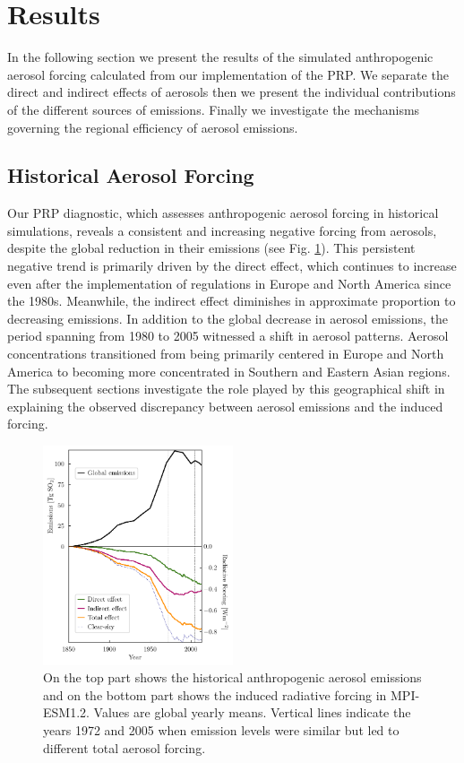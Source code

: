 \documentclass[draft]{agujournal2019}
\begin{document}
\section{Results}
      In the following section we present the results of the simulated anthropogenic aerosol forcing calculated from our implementation of the PRP. We separate the direct and indirect effects of aerosols then we present the individual contributions of the different sources of emissions. Finally we investigate the mechanisms governing the regional efficiency of aerosol emissions.

      \subsection{Historical Aerosol Forcing}
            Our PRP diagnostic, which assesses anthropogenic aerosol forcing in historical simulations, reveals a consistent and increasing negative forcing from aerosols, despite the global reduction in their emissions (see Fig. \ref{fig:figure1}). This persistent negative trend is primarily driven by the direct effect, which continues to increase even after the implementation of regulations in Europe and North America since the 1980s. Meanwhile, the indirect effect diminishes in approximate proportion to decreasing emissions.
            In addition to the global decrease in aerosol emissions, the period spanning from 1980 to 2005 witnessed a shift in aerosol patterns. Aerosol concentrations transitioned from being primarily centered in Europe and North America to becoming more concentrated in Southern and Eastern Asian regions.
            The subsequent sections investigate the role played by this geographical shift in explaining the observed discrepancy between aerosol emissions and the induced forcing.

      \begin{figure}
            \centering
            \noindent\includegraphics[width=0.5\textwidth]{../../figures/figure1}
            \caption{On the top part shows the historical anthropogenic aerosol emissions and on the bottom part shows the induced radiative forcing in MPI-ESM1.2. Values are global yearly means. Vertical lines indicate the years 1972 and 2005 when emission levels were similar but led to different total aerosol forcing.}
            \label{fig:figure1}
      \end{figure}
\end{document}
